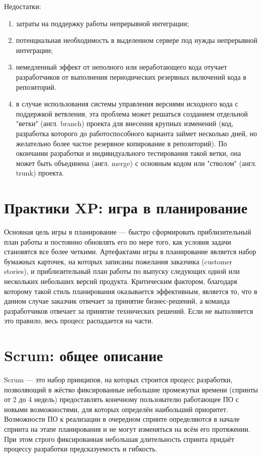 \documentclass{article}
\let\stdsection\section
\renewcommand\section{\newpage\stdsection}
\begin{document}
    Недостатки:
    \begin{enumerate}
        \item затраты на поддержку работы непрерывной интеграции;
        \item потенциальная необходимость в выделенном сервере под нужды непрерывной интеграции;
        \item немедленный эффект от неполного или неработающего кода отучает разработчиков от выполнения периодических резервных включений кода в репозиторий.
        \item в случае использования системы управления версиями исходного кода с поддержкой ветвления, эта проблема может решаться созданием отдельной "ветки" (англ. branch) проекта для внесения крупных изменений (код, разработка которого до работоспособного варианта займет несколько дней, но желательно более частое резервное копирование в репозиторий). По окончании разработки и индивидуального тестирования такой ветки, она может быть объединена (англ. merge) с основным кодом или "стволом" (англ. trunk) проекта.
    \end{enumerate}

\section{Практики XP: игра в планирование}
    Основная цель игры в планирование — быстро сформировать приблизительный план работы и постоянно обновлять его по мере того, как условия задачи становятся все более четкими. Артефактами игры в планирование является набор бумажных карточек, на которых записаны пожелания заказчика (customer stories), и приблизительный план работы по выпуску следующих одной или нескольких небольших версий продукта. Критическим фактором, благодаря которому такой стиль планирования оказывается эффективным, является то, что в данном случае заказчик отвечает за принятие бизнес-решений, а команда разработчиков отвечает за принятие технических решений. Если не выполняется это правило, весь процесс распадается на части.

\section{Scrum: общее описание}
    Scrum — это набор принципов, на которых строится процесс разработки, позволяющий в жёстко фиксированные небольшие промежутки времени (спринты от 2 до 4 недель) предоставлять конечному пользователю работающее ПО с новыми возможностями, для которых определён наибольший приоритет. Возможности ПО к реализации в очередном спринте определяются в начале спринта на этапе планирования и не могут изменяться на всём его протяжении. При этом строго фиксированная небольшая длительность спринта придаёт процессу разработки предсказуемость и гибкость.
\end{document}
